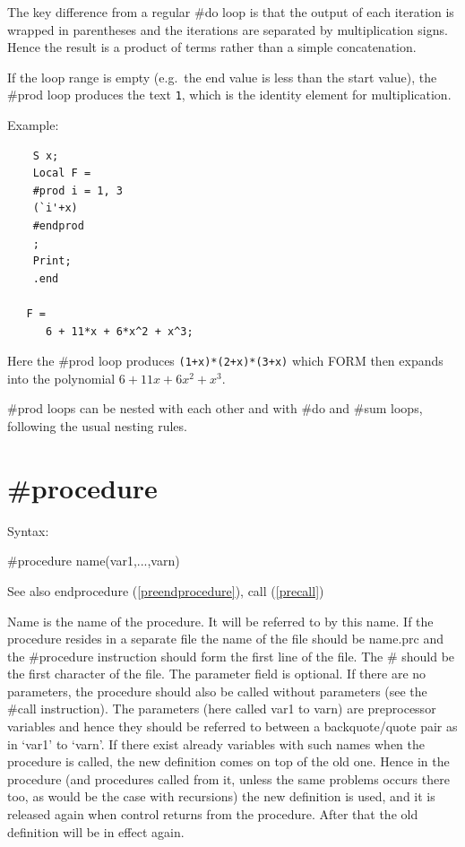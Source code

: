 The key difference from a regular \#do loop is that the output of each 
iteration is wrapped in parentheses and the iterations are separated by 
multiplication signs. Hence the result is a product of terms rather than 
a simple concatenation.

If the loop range is empty (e.g.\ the end value is less than the start 
value), the \#prod loop produces the text \verb:1:, which is the 
identity element for multiplication.

Example:
\begin{verbatim}
    S x;
    Local F =
    #prod i = 1, 3
    (`i'+x)
    #endprod
    ;
    Print;
    .end

   F =
      6 + 11*x + 6*x^2 + x^3;
\end{verbatim}
Here the \#prod loop produces \verb:(1+x)*(2+x)*(3+x): which FORM then 
expands into the polynomial $6 + 11x + 6x^2 + x^3$.

\#prod loops can be nested with each other and with \#do and \#sum loops, 
following the usual nesting rules.


\section{\#procedure}
\label{preprocedure}

\noindent Syntax:

\#procedure name(var1,...,varn)
 
\noindent See also endprocedure (\ref{preendprocedure}), call
(\ref{precall})

\noindent Name is the name of the 
procedure. It will be referred to by this name. If the 
procedure resides in a separate file the name of the file should be 
name.prc and the \#procedure instruction should form the first line of the 
file. The \# should be the first character of the file. The parameter field 
is optional. If there are no parameters, the procedure should also be 
called without parameters (see the \#call instruction). The parameters 
(here called var1 to varn) are preprocessor variables and hence they should 
be referred to between a backquote/quote pair 
as in `var1' to `varn'. If there exist already variables with such names 
when the procedure is called, the new definition comes on top of the old 
one. Hence in the procedure (and procedures called from it, unless the same 
problems occurs there too, as would be the case with recursions) the new 
definition is used, and it is released again when control returns from the 
procedure. After that the old definition will be in effect again.

